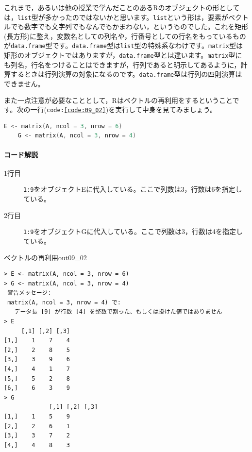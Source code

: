 \documentclass{ltjsbook}
\begin{document}
これまで，あるいは他の授業で学んだことのあるRのオブジェクトの形としては，\texttt{list}型が多かったのではないかと思います。\texttt{list}という形は，要素がベクトルでも数字でも文字列でもなんでもかまわない，というものでした。これを矩形(長方形)に整え，変数名としての列名や，行番号としての行名をもっているものが\texttt{data.frame}型です。\texttt{data.frame}型は\texttt{list}型の特殊系なわけです。\texttt{matrix}型は矩形のオブジェクトではありますが，\texttt{data.frame}型とは違います。\texttt{matrix}型にも列名，行名をつけることはできますが，行列であると明示してあるように，計算するときは行列演算の対象になるのです。\texttt{data.frame}型は行列の四則演算はできません。

また一点注意が必要なこととして，Rはベクトルの再利用をするということです。次の一行(\texttt{code:\ref{code:09_02}})を実行して中身を見てみましょう。

\begin{lstlisting}[language=c++,label={code:09_02},caption={ベクトルデータの保持}]
    E <- matrix(A, ncol = 3, nrow = 6)
    G <- matrix(A, ncol = 3, nrow = 4)
\end{lstlisting}
\paragraph{コード解説}
\begin{description}
	\item[1行目] \texttt{1:9}をオブジェクトEに代入している。ここで列数は3，行数は6を指定している。
	\item[2行目] \texttt{1:9}をオブジェクトGに代入している。ここで列数は3，行数は4を指定している。
\end{description}

\begin{Rscreen}{ベクトルの再利用}{out09_02}
	\begin{verbatim}
> E <- matrix(A, ncol = 3, nrow = 6)
> G <- matrix(A, ncol = 3, nrow = 4)
 警告メッセージ: 
 matrix(A, ncol = 3, nrow = 4) で: 
   データ長 [9] が行数 [4] を整数で割った、もしくは掛けた値ではありません 
> E
     [,1] [,2] [,3]
[1,]    1    7    4
[2,]    2    8    5
[3,]    3    9    6
[4,]    4    1    7
[5,]    5    2    8
[6,]    6    3    9
> G
             [,1] [,2] [,3]
[1,]    1    5    9
[2,]    2    6    1
[3,]    3    7    2
[4,]    4    8    3
\end{verbatim}
\end{Rscreen}
\end{document}
